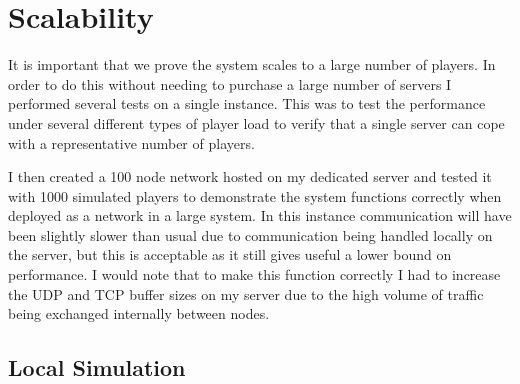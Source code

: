 \documentclass[12pt,notitlepage,a4paper]{report}
\begin{document}
	\section{Scalability}
	It is important that we prove the system scales to a large number of players. In order to do this without needing to purchase a large number of servers I performed several tests on a single instance. This was to test the performance under several different types of player load to verify that a single server can cope with a representative number of players.
	
	I then created a 100 node network hosted on my dedicated server and tested it with 1000 simulated players to demonstrate the system functions correctly when deployed as a network in a large system. In this instance communication will have been slightly slower than usual due to communication being handled locally on the server, but this is acceptable as it still gives useful a lower bound on performance. I would note that to make this function correctly I had to increase the UDP and TCP buffer sizes on my server due to the high volume of traffic being exchanged internally between nodes.
	\subsection{Local Simulation}
	\label{sec:localsim}
\end{document}

